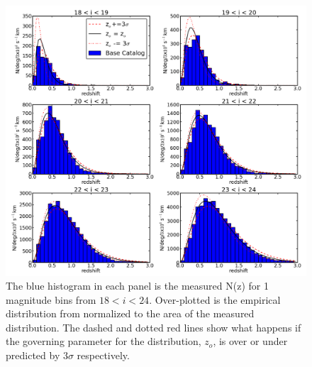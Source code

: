 \documentclass[]{article}
\begin{document}
\begin{figure}[th]
\centering
\includegraphics[width=5in]{validation_figures/Nofz_18_24.png}
\caption{The blue histogram in each panel is the measured N(z) for 1 magnitude bins from $18<i<24$.  Over-plotted is the empirical distribution from \citet{coil04} normalized to the area of the measured distribution.  The dashed and dotted red lines show what happens if the governing parameter for the \citet{coil04} distribution, $z_o$, is over
or under predicted by $3\sigma$ respectively.\label{fig:nofz18_24}}
\end{figure}
\end{document}
